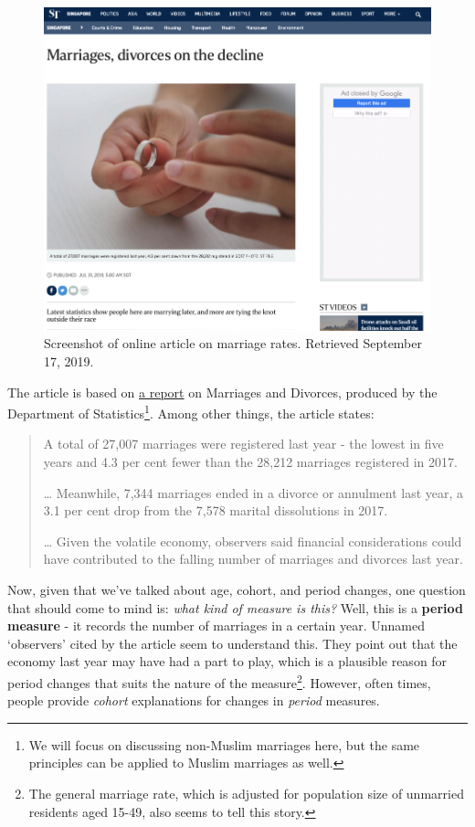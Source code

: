 \documentclass[
  openany]{book}
\begin{document}
\begin{figure}

{\centering \includegraphics[width=0.8\linewidth]{images/apc/apc_marriage} 

}

\caption{Screenshot of online article on marriage rates. Retrieved September 17, 2019.}\label{fig:st-apcmarriage}
\end{figure}

The article is based on \href{https://www.singstat.gov.sg/-/media/files/publications/population/smd2018.pdf}{a report} on Marriages and Divorces, produced by the Department of Statistics\footnote{We will focus on discussing non-Muslim marriages here, but the same principles can be applied to Muslim marriages as well.}. Among other things, the article states:

\begin{quote}
A total of 27,007 marriages were registered last year - the lowest in five years and 4.3 per cent fewer than the 28,212 marriages registered in 2017.

\ldots{} Meanwhile, 7,344 marriages ended in a divorce or annulment last year, a 3.1 per cent drop from the 7,578 marital dissolutions in 2017.

\ldots{} Given the volatile economy, observers said financial considerations could have contributed to the falling number of marriages and divorces last year.
\end{quote}

Now, given that we've talked about age, cohort, and period changes, one question that should come to mind is: \emph{what kind of measure is this?} Well, this is a \textbf{period measure} - it records the number of marriages in a certain year. Unnamed `observers' cited by the article seem to understand this. They point out that the economy last year may have had a part to play, which is a plausible reason for period changes that suits the nature of the measure\footnote{The general marriage rate, which is adjusted for population size of unmarried residents aged 15-49, also seems to tell this story.}. However, often times, people provide \emph{cohort} explanations for changes in \emph{period} measures.
\end{document}
